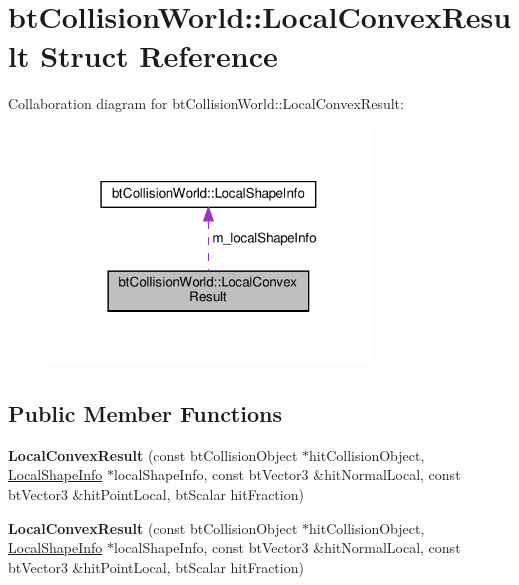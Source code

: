 \hypertarget{structbtCollisionWorld_1_1LocalConvexResult}{}\section{bt\+Collision\+World\+:\+:Local\+Convex\+Result Struct Reference}
\label{structbtCollisionWorld_1_1LocalConvexResult}


Collaboration diagram for bt\+Collision\+World\+:\+:Local\+Convex\+Result\+:
\nopagebreak
\begin{figure}[H]
\begin{center}
\leavevmode
\includegraphics[width=243pt]{structbtCollisionWorld_1_1LocalConvexResult__coll__graph}
\end{center}
\end{figure}
\subsection*{Public Member Functions}
\begin{DoxyCompactItemize}
\item 
\mbox{\label{structbtCollisionWorld_1_1LocalConvexResult_a954dda3e8da8989aa61d5c49c9809b84}} 
{\bfseries Local\+Convex\+Result} (const bt\+Collision\+Object $\ast$hit\+Collision\+Object, \hyperlink{structbtCollisionWorld_1_1LocalShapeInfo}{Local\+Shape\+Info} $\ast$local\+Shape\+Info, const bt\+Vector3 \&hit\+Normal\+Local, const bt\+Vector3 \&hit\+Point\+Local, bt\+Scalar hit\+Fraction)
\item 
\mbox{\label{structbtCollisionWorld_1_1LocalConvexResult_a954dda3e8da8989aa61d5c49c9809b84}} 
{\bfseries Local\+Convex\+Result} (const bt\+Collision\+Object $\ast$hit\+Collision\+Object, \hyperlink{structbtCollisionWorld_1_1LocalShapeInfo}{Local\+Shape\+Info} $\ast$local\+Shape\+Info, const bt\+Vector3 \&hit\+Normal\+Local, const bt\+Vector3 \&hit\+Point\+Local, bt\+Scalar hit\+Fraction)
\end{DoxyCompactItemize}
